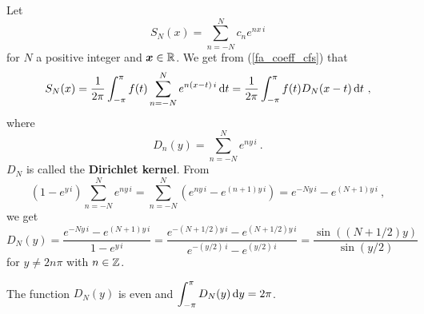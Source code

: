Let
\[
S_N(x) = \sum_{n=-N}^N c_n e^{n x\, i}
\]
for $N$ a positive integer and ${\bm{x}} \in \mathbb{R}$.  We get from
(\ref{fa_coeff_cfs}) that
\[
S_N(x) = \frac{1}{2\pi} \int_{-\pi}^{\pi} f(t) \sum_{n=-N}^N
e^{n(x-t)\, i} \,\mathrm{d}{t}
= \frac{1}{2\pi} \int_{-\pi}^{\pi} f(t) D_N(x-t) \,\mathrm{d}{t} \ ,
\]
where
\[
D_n(y) = \sum_{n=-N}^N e^{n y \, i} \ .
\]
$D_N$ is called the {\bfseries Dirichlet kernel}.
From
\[
(1-e^{y\, i}) \sum_{n=-N}^N e^{n y \, i} = 
\sum_{n=-N}^N \left( e^{n y \, i} - e^{(n+1) y \, i} \right)
= e^{-N y \, i} - e^{(N+1) y \, i} \ ,
\]
we get
\[
D_N(y) = \frac{e^{-N y \, i} - e^{(N+1) y \, i}}{1-e^{y\, i}}
= \frac{e^{-(N+1/2) y \, i} - e^{(N+1/2) y \, i}}{e^{-(y/2)\,i}-e^{(y/2)\, i}}
= \frac{ \sin( (N+1/2)y)}{\sin(y/2)}
\]
for $y \neq 2 n \pi$ with $n \in \mathbb{Z}$.

The function $D_N(y)$ is even and
$\displaystyle \int_{-\pi}^{\pi} D_N(y) \,\mathrm{d}{y} = 2\pi$.

